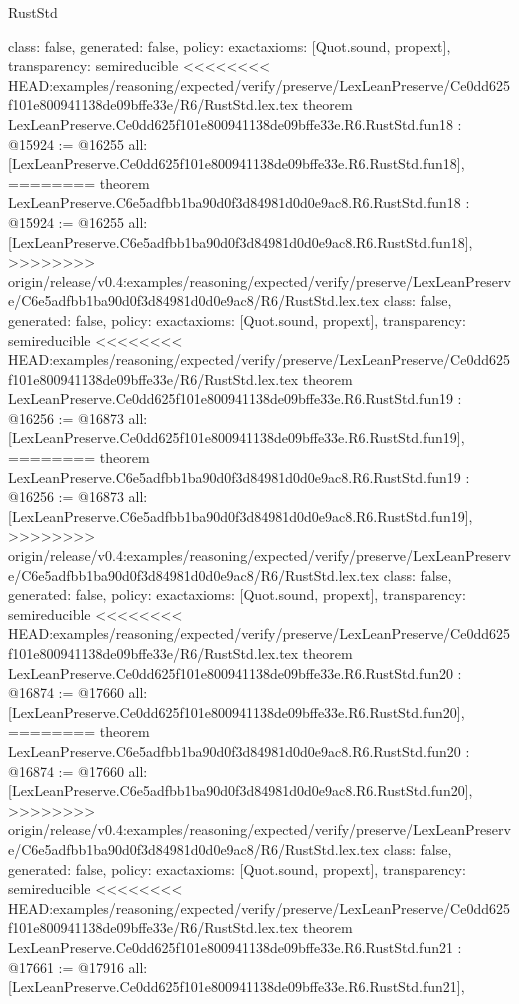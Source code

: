 \begin{lexlean}{RustStd}
\begin{coremodule}
{\begin{coremodule}
{{{{{{{{{{{{{{{{{{{{{  class: false,
  generated: false,
  policy: exact{axioms: [Quot.sound, propext]},
  transparency: semireducible
}
<<<<<<<< HEAD:examples/reasoning/expected/verify/preserve/LexLeanPreserve/Ce0dd625f101e800941138de09bffe33e/R6/RustStd.lex.tex
theorem LexLeanPreserve.Ce0dd625f101e800941138de09bffe33e.R6.RustStd.fun18 : @15924 := @16255 {
  all: [LexLeanPreserve.Ce0dd625f101e800941138de09bffe33e.R6.RustStd.fun18],
========
theorem LexLeanPreserve.C6e5adfbb1ba90d0f3d84981d0d0e9ac8.R6.RustStd.fun18 : @15924 := @16255 {
  all: [LexLeanPreserve.C6e5adfbb1ba90d0f3d84981d0d0e9ac8.R6.RustStd.fun18],
>>>>>>>> origin/release/v0.4:examples/reasoning/expected/verify/preserve/LexLeanPreserve/C6e5adfbb1ba90d0f3d84981d0d0e9ac8/R6/RustStd.lex.tex
  class: false,
  generated: false,
  policy: exact{axioms: [Quot.sound, propext]},
  transparency: semireducible
}
<<<<<<<< HEAD:examples/reasoning/expected/verify/preserve/LexLeanPreserve/Ce0dd625f101e800941138de09bffe33e/R6/RustStd.lex.tex
theorem LexLeanPreserve.Ce0dd625f101e800941138de09bffe33e.R6.RustStd.fun19 : @16256 := @16873 {
  all: [LexLeanPreserve.Ce0dd625f101e800941138de09bffe33e.R6.RustStd.fun19],
========
theorem LexLeanPreserve.C6e5adfbb1ba90d0f3d84981d0d0e9ac8.R6.RustStd.fun19 : @16256 := @16873 {
  all: [LexLeanPreserve.C6e5adfbb1ba90d0f3d84981d0d0e9ac8.R6.RustStd.fun19],
>>>>>>>> origin/release/v0.4:examples/reasoning/expected/verify/preserve/LexLeanPreserve/C6e5adfbb1ba90d0f3d84981d0d0e9ac8/R6/RustStd.lex.tex
  class: false,
  generated: false,
  policy: exact{axioms: [Quot.sound, propext]},
  transparency: semireducible
}
<<<<<<<< HEAD:examples/reasoning/expected/verify/preserve/LexLeanPreserve/Ce0dd625f101e800941138de09bffe33e/R6/RustStd.lex.tex
theorem LexLeanPreserve.Ce0dd625f101e800941138de09bffe33e.R6.RustStd.fun20 : @16874 := @17660 {
  all: [LexLeanPreserve.Ce0dd625f101e800941138de09bffe33e.R6.RustStd.fun20],
========
theorem LexLeanPreserve.C6e5adfbb1ba90d0f3d84981d0d0e9ac8.R6.RustStd.fun20 : @16874 := @17660 {
  all: [LexLeanPreserve.C6e5adfbb1ba90d0f3d84981d0d0e9ac8.R6.RustStd.fun20],
>>>>>>>> origin/release/v0.4:examples/reasoning/expected/verify/preserve/LexLeanPreserve/C6e5adfbb1ba90d0f3d84981d0d0e9ac8/R6/RustStd.lex.tex
  class: false,
  generated: false,
  policy: exact{axioms: [Quot.sound, propext]},
  transparency: semireducible
}
<<<<<<<< HEAD:examples/reasoning/expected/verify/preserve/LexLeanPreserve/Ce0dd625f101e800941138de09bffe33e/R6/RustStd.lex.tex
theorem LexLeanPreserve.Ce0dd625f101e800941138de09bffe33e.R6.RustStd.fun21 : @17661 := @17916 {
  all: [LexLeanPreserve.Ce0dd625f101e800941138de09bffe33e.R6.RustStd.fun21],
}}}}}}}}}}}}}}}}}}}}}}}}
\end{coremodule}}
\end{coremodule}
\end{lexlean}

